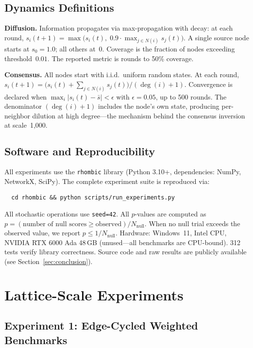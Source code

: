 \documentclass[11pt]{article}
\begin{document}
\subsection{Dynamics Definitions}

\textbf{Diffusion.} Information propagates via max-propagation with
decay: at each round,
$s_i(t{+}1) = \max\bigl(s_i(t),\; 0.9 \cdot \max_{j \in N(i)} s_j(t)\bigr)$.
A single source node starts at $s_0 = 1.0$; all others at~$0$.
Coverage is the fraction of nodes exceeding threshold~$0.01$.
The reported metric is rounds to 50\% coverage.

\textbf{Consensus.} All nodes start with i.i.d.\ uniform random states.
At each round,
$s_i(t{+}1) = \bigl(s_i(t) + \sum_{j \in N(i)} s_j(t)\bigr) / (\deg(i) + 1)$.
Convergence is declared when
$\max_i |s_i(t) - \bar{s}| < \epsilon$ with $\epsilon = 0.05$,
up to 500 rounds. The denominator $(\deg(i) + 1)$ includes the
node's own state, producing per-neighbor dilution at high
degree---the mechanism behind the consensus inversion at scale~1{,}000.

\subsection{Software and Reproducibility}

All experiments use the \texttt{rhombic} library (Python 3.10+,
dependencies: NumPy, NetworkX, SciPy). The complete experiment
suite is reproduced via:
\begin{verbatim}
  cd rhombic && python scripts/run_experiments.py
\end{verbatim}
All stochastic operations use \texttt{seed=42}. All $p$-values are
computed as $p = (\text{number of null scores} \geq \text{observed}) /
N_{\text{null}}$. When no null trial exceeds the observed value, we
report $p \leq 1/N_{\text{null}}$. Hardware: Windows~11,
Intel CPU, NVIDIA RTX 6000 Ada 48\,GB (unused---all benchmarks are
CPU-bound). 312 tests verify library correctness. Source code and
raw results are publicly available (see
Section~\ref{sec:conclusion}).

\section{Lattice-Scale Experiments}
\label{sec:lattice}

\subsection{Experiment 1: Edge-Cycled Weighted Benchmarks}
\end{document}
